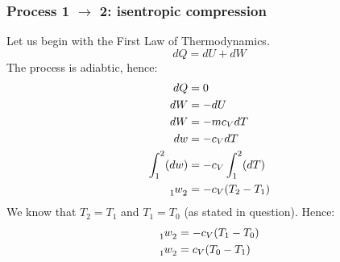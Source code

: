 \documentclass[12pt]{article}
\numberwithin{equation}{section}
\begin{document}
\begin{flushleft}
\subsubsection*{Process 1 $\rightarrow$ 2: isentropic compression}
Let us begin with the First Law of Thermodynamics.
\begin{equation}
  dQ = dU + dW
\end{equation}
The process is adiabtic, hence:
\begin{align}
  dQ &= 0\\
  dW &= - dU\\
  dW &= -m c_V dT\\
  dw &= - c_V dT\\
  \int_1^2(dw) &= -c_V \int_1^2(dT)\\
  \tensor[_1]{w}{_2} &= -c_V (T_2 - T_1)\\
\end{align}
We know that $T_2 = T_1$ and $T_1 = T_0$ (as stated in question). Hence:
\begin{align}
  \tensor[_1]{w}{_2} &= -c_V (T_1 - T_0)\\
  \tensor[_1]{w}{_2} &= c_V (T_0 - T_1)
\end{align}


\end{flushleft}
\end{document}
